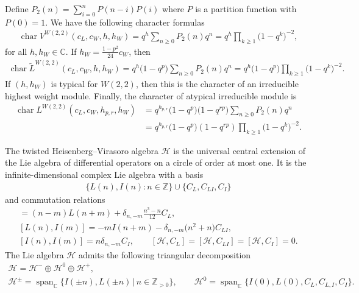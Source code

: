 \documentclass[11pt]{article}
\numberwithin{equation}{section}
\newcommand{\Z}{\mathbb Z}
\newcommand{\C}{\mathbb C}
\newcommand{\HVir}{\mathcal H}
\DeclareMathOperator{\ch}{char}
\begin{document}
Def\/ine $P_{2}(n) =\sum\limits_{i=0}^{n}P(n-i)P(i)$ where $P $ is a partition function with $P(0)=1$. We have the following character
formulas~\cite{R-JMP}
\begin{gather*}
\ch V^{W(2,2)}( c_{L},c_{W},h,h_{W}) =q^{h}\sum_{n\geq0}P_{2}(n)q^{n}=q^{h}\prod\limits_{k\geq1}\big(1-q^{k}\big)^{-2},
\end{gather*}
for all $h,h_W \in \C$. If $h_W = \frac{1-p^2}{24}c_W$, then
\begin{gather*}
\ch \widetilde{L}^{W(2,2)}(c_{L},c_{W},h,h_{W}) =q^{h}\big(1-q^{p}\big)\sum_{n\geq0}P_{2}(n)q^{n}
 =q^{h}\big(1-q^{p}\big)\prod\limits_{k\geq1}\big(1-q^{k}\big)^{-2}.
\end{gather*}
If $(h,h_W)$ is typical for $W(2,2)$, then this is the character of an irreducible highest weight module. Finally, the character of atypical irreducible module is
\begin{align*}
\ch L^{W(2,2)}( c_{L},c_{W},h_{p,r},h_{W})& =q^{h_{p,r}}\big(1-q^{p}\big)\big(1-q^{rp}\big)\sum_{n\geq0}P_{2}(n)q^{n} \\
& =q^{h_{p,r}}\big(1-q^{p}\big)(1-q^{rp})\prod\limits_{k\geq1}\big(1-q^{k}\big)^{-2}.
\end{align*}

The twisted Heisenberg--Virasoro algebra $\HVir$ is the universal central extension of the Lie algebra of dif\/ferential operators on a circle of order at most one. It is the inf\/inite-dimensional complex Lie algebra with a basis
\begin{gather*}
\{L(n),I(n)\colon n\in\Z\}\cup\{C_{L},C_{LI},C_{I}\}
\end{gather*}
and commutation relations
\begin{gather*}
[ L(n),L(m)] =(n-m)L(n+m)+\delta_{n,-m}\frac{n^{3}-n}{12}C_{L},\\
[ L(n),I(m)] =-mI(n+m)-\delta_{n,-m}\big(n^{2}+n\big)C_{LI}, \\
[ I(n),I(m)] =n\delta_{n,-m}C_{I}, \qquad
[ {\HVir},C_{L}] =[ {\HVir},C_{LI}] =[ \HVir,C_{I}] =0.
\end{gather*}
The Lie algebra $\HVir$ admits the following triangular decomposition
\begin{gather}
\HVir =\HVir ^{-} \oplus \HVir^0 \oplus \HVir^{+}, \label{triangular} \\
\HVir ^{\pm} = \operatorname{span}_{\mathbb C} \{ I( \pm n), L(\pm n) \,|\, n \in {\Z}_{>0}\}, \qquad
\HVir^0 = \operatorname{span}_{\mathbb C} \{ I(0), L(0), C_L, C_{L,I}, C_{I} \}. \nonumber
\end{gather}
\end{document}
